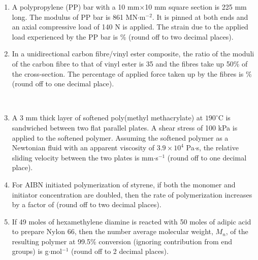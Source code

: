 \documentclass[journal,12pt,onecolumn]{IEEEtran}
\begin{document}
\begin{enumerate}
\vspace{0.5cm}

\item A polypropylene (PP) bar with a 10 mm$\times$10 mm square section is 225 mm long. The modulus of PP bar is 861 MN$\cdot$m$^{-2}$. It is pinned at both ends and an axial compressive load of 140 N is applied. The strain due to the applied load experienced by the PP bar is \underline{\hspace{2cm}}\% (round off to two decimal places).
\hfill{} \\

\newpage

\item In a unidirectional carbon fibre/vinyl ester composite, the ratio of the moduli of the carbon fibre to that of vinyl ester is 35 and the fibres take up 50\% of the cross-section. The percentage of applied force taken up by the fibres is \underline{\hspace{1cm}}\% (round off to one decimal place).

\hfill{} \\

\vspace{0.5cm}

\item A 3 mm thick layer of softened poly(methyl methacrylate) at $190^\circ$C is sandwiched between two flat parallel plates. A shear stress of 100 kPa is applied to the softened polymer. Assuming the softened polymer as a Newtonian fluid with an apparent viscosity of $3.9\times10^{4}$ Pa$\cdot$s, the relative sliding velocity between the two plates is \underline{\hspace{2cm}} mm$\cdot$s$^{-1}$ (round off to one decimal place).
\hfill{} \\

\vspace{0.5cm}

\item For AIBN initiated polymerization of styrene, if both the monomer and initiator concentration are doubled, then the rate of polymerization increases by a factor of \underline{\hspace{2cm}} (round off to two decimal places).
\hfill{} \\

\vspace{0.5cm}

\item If 49 moles of hexamethylene diamine is reacted with 50 moles of adipic acid to prepare Nylon 66, then the number average molecular weight, $M_{n}$, of the resulting polymer at 99.5\% conversion (ignoring contribution from end groups) is \underline{\hspace{2cm}} g$\cdot$mol$^{-1}$ (round off to 2 decimal places).
\vspace{0.05cm}
\hfill{} \\


\end{enumerate}
\end{document}

